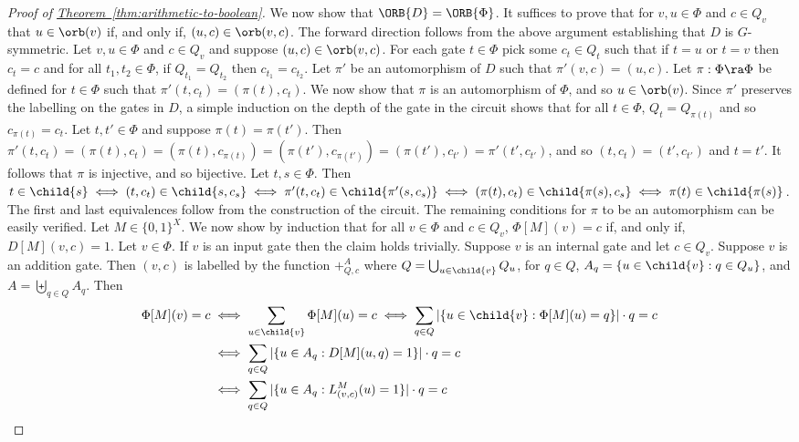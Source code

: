 \documentclass[11pt]{article}
\newcommand{\expref}[2]{\texorpdfstring{\hyperref[#2]{#1~\ref{#2}}}{#1~\ref{#2}}}
\begin{document}
\begin{proof}[Proof of \expref{Theorem}{thm:arithmetic-to-boolean}]
  We now show that $\ORB{D} = \ORB{\Phi}$. It suffices to prove that for $v, u
  \in \Phi$ and $c \in Q_v$ that $u \in \orb(v)$ if, and only if, $(u, c) \in
  \orb(v, c)$. The forward direction follows from the above argument
  establishing that $D$ is $G$-symmetric. Let $v, u \in \Phi$ and $c \in Q_v$
  and suppose $(u, c) \in \orb(v, c)$. For each gate $t \in \Phi$ pick some $c_t
  \in Q_t$ such that if $t = u$ or $t = v$ then $c_t = c$ and for all $t_1, t_2
  \in \Phi$, if $Q_{t_1} = Q_{t_2}$ then $c_{t_1} = c_{t_2}$. Let $\pi'$ be an
  automorphism of $D$ such that $\pi'(v, c) = (u, c)$. Let $\pi : \Phi \ra \Phi$
  be defined for $t \in \Phi$ such that $\pi' (t, c_t) = (\pi(t), c_t)$. We now
  show that $\pi$ is an automorphism of $\Phi$, and so $u \in
  \orb(v)$. Since $\pi'$ preserves the labelling on the gates in $D$,
  a simple induction on the depth of the gate in the circuit shows 
  that for all $t \in \Phi$, $Q_{t} = Q_{\pi(t)}$ and so $c_{\pi(t)} = c_t$. Let
  $t, t' \in \Phi$ and suppose $\pi(t) = \pi (t')$. Then $\pi'(t, c_t) =
  (\pi(t), c_t) = (\pi(t), c_{\pi(t)}) = (\pi(t'), c_{\pi(t')}) = (\pi(t'),
  c_{t'}) = \pi'(t', c_{t'})$, and so $(t, c_t) = (t', c_{t'})$ and $t = t'$. It
  follows that $\pi$ is injective, and so bijective. Let $t, s \in \Phi$. Then
  $t \in \child{s} \iff (t, c_t) \in \child{s, c_s} \iff \pi'(t, c_t) \in
  \child{\pi'(s, c_s)} \iff (\pi(t), c_t) \in \child{\pi(s), c_s} \iff \pi(t)
  \in \child{\pi(s)}$. The first and last equivalences follow from the
  construction of the circuit. The remaining conditions for $\pi$ to be an
  automorphism can be easily verified.
  Let $M \in \{0, 1\}^{X}$. We now show by induction that for all $v \in \Phi$
  and $c \in Q_v$, $\Phi[M](v) = c$ if, and only if, $D[M](v, c) = 1$. Let $v
  \in \Phi$. If $v$ is an input gate then the claim holds trivially. Suppose $v$
  is an internal gate and let $c \in Q_v$. Suppose $v$ is an addition gate. Then
  $(v, c)$ is labelled by the function $+^A_{Q, c}$ where $Q = \bigcup_{u \in
    \child{v}} Q_u$, for $q \in Q$, $A_q = \{u \in \child{v} : q \in Q_u\}$, and
  $A = \biguplus_{q \in Q}A_q$. Then
  \begin{align*}
    \Phi[M](v) = c &\iff \sum_{u \in \child{v}} \Phi[M](u) = c 
                     \iff \sum_{q \in Q} \vert \{u \in  \child{v} : \Phi[M](u) = q\}\vert \cdot q = c\\
                   &\iff \sum_{q \in  Q} \vert \{u \in A_q : D[M](u, q) = 1\}\vert \cdot q = c \\
                   &\iff \sum_{q \in Q} \vert \{u \in A_q : L^M_{(v, c)}(u) = 1\} \vert \cdot q = c\\

\end{align*}
\end{proof}
\end{document}
